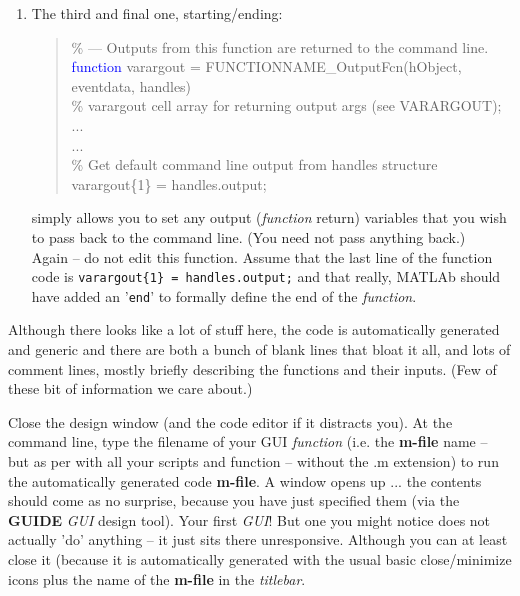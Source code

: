 \documentclass{tufte-book} %
\newenvironment{docspecmargin}{\begin{quotation}\ttfamily\footnotesize\parskip0pt\parindent0pt\ignorespaces}{\end{quotation}}
\begin{document}
\begin{enumerate}[noitemsep]
\vspace{1mm}
\item The third and final one, starting/ending:
\begin{docspecmargin}
\textcolor[rgb]{0,0.501961,0}{\% --- Outputs from this function are returned to the command line.}\\
\textcolor{blue}{function} varargout = FUNCTIONNAME\_OutputFcn(hObject, eventdata, handles) \\
\textcolor[rgb]{0,0.501961,0}{\% varargout  cell array for returning output args (see VARARGOUT);}\\
...\\
...\\
\textcolor[rgb]{0,0.501961,0}{\% Get default command line output from handles structure}\\
varargout\{1\} = handles.output;
\end{docspecmargin}
simply allows you to set any output (\textit{function} return) variables that you wish to pass back to the command line. (You need not pass anything back.)
\\Again -- do not edit this function. Assume that the last line of the function code is \texttt{varargout\{1\} = handles.output;} and that really, MATLAb should have added an '\texttt{end}' to formally define the end of the \textit{function}.
\end{enumerate}

Although there looks like a lot of stuff here, the code is automatically generated and generic and there are both a bunch of blank lines that bloat it all, and lots of comment lines, mostly briefly describing the functions and their inputs. (Few of these bit of information we care about.) 

Close the design window (and the code editor if it distracts you). At the command line, type the filename of your GUI \textit{function} (i.e. the \textbf{m-file} name -- but as per with all your scripts and function -- without the \textsf{.m} extension) to run the automatically generated code \textbf{m-file}. A window opens up ... the contents should come as no surprise, because you have just specified them (via the \textbf{GUIDE} \textit{GUI} design tool). Your first \textit{GUI}! But one you might notice does not actually 'do' anything -- it just sits there unresponsive. Although you can at least close it (because it is automatically generated with the usual basic close/minimize icons plus the name of the \textbf{m-file} in the \textit{titlebar}.
\end{document}
